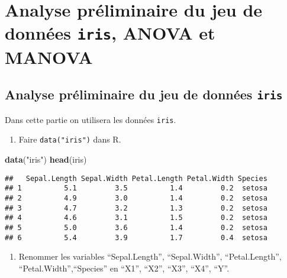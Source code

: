 \documentclass[
]{article}
\newenvironment{Shaded}{\begin{snugshade}}{\end{snugshade}}
\newcommand{\KeywordTok}[1]{\textcolor[rgb]{0.13,0.29,0.53}{\textbf{#1}}}
\newcommand{\NormalTok}[1]{#1}
\newcommand{\StringTok}[1]{\textcolor[rgb]{0.31,0.60,0.02}{#1}}
\providecommand{\tightlist}{%
  \setlength{\itemsep}{0pt}\setlength{\parskip}{0pt}}
\begin{document}
\hypertarget{analyse-pruxe9liminaire-du-jeu-de-donnuxe9es-iris-anova-et-manova}{%
\section{\texorpdfstring{Analyse préliminaire du jeu de données
\texttt{iris}, ANOVA et
MANOVA}{Analyse préliminaire du jeu de données iris, ANOVA et MANOVA}}\label{analyse-pruxe9liminaire-du-jeu-de-donnuxe9es-iris-anova-et-manova}}

\hypertarget{analyse-pruxe9liminaire-du-jeu-de-donnuxe9es-iris}{%
\subsection{\texorpdfstring{Analyse préliminaire du jeu de données
\texttt{iris}}{Analyse préliminaire du jeu de données iris}}\label{analyse-pruxe9liminaire-du-jeu-de-donnuxe9es-iris}}

Dans cette partie on utilisera les données \texttt{iris}.

\begin{enumerate}
\def\labelenumi{\arabic{enumi}.}
\setcounter{enumi}{2}
\tightlist
\item
  Faire \texttt{data("iris")} dans R.
\end{enumerate}

\begin{Shaded}
\begin{Highlighting}[]
\KeywordTok{data}\NormalTok{(}\StringTok{"iris"}\NormalTok{)}
\KeywordTok{head}\NormalTok{(iris)}
\end{Highlighting}
\end{Shaded}

\begin{verbatim}
##   Sepal.Length Sepal.Width Petal.Length Petal.Width Species
## 1          5.1         3.5          1.4         0.2  setosa
## 2          4.9         3.0          1.4         0.2  setosa
## 3          4.7         3.2          1.3         0.2  setosa
## 4          4.6         3.1          1.5         0.2  setosa
## 5          5.0         3.6          1.4         0.2  setosa
## 6          5.4         3.9          1.7         0.4  setosa
\end{verbatim}

\begin{enumerate}
\def\labelenumi{\arabic{enumi}.}
\setcounter{enumi}{3}
\tightlist
\item
  Renommer les variables ``Sepal.Length'', ``Sepal.Width'',
  ``Petal.Length'', ``Petal.Width'',``Species'' en ``X1'', ``X2'',
  ``X3'', ``X4'', ``Y''.
\end{enumerate}
\end{document}
